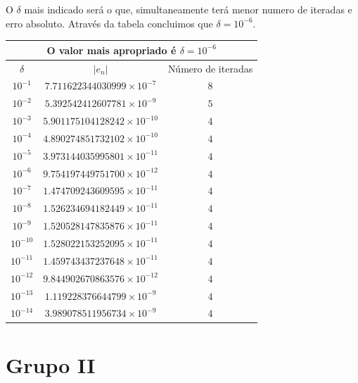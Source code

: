 \documentclass[a4paper,10pt]{extarticle}
\begin{document}
\begin{enumerate}
\begin{enumerate}
{}
O $\delta$ mais indicado será o que, simultaneamente terá menor numero de iteradas e erro absoluto. Através da tabela concluimos que $\delta=10^{-6}$.
\begin{center}
{\small \begin{tabular}{|c|c|c|}
\hline
\multicolumn{3}{|c|}{O valor mais apropriado é $\delta=10^{-6}$}\\
\hline
$\delta$&$|e_n|$&Número de iteradas\\
\hline
$10^{-1}$&$7.711622344030999\times 10^{-7}$&$8$\\
\hline
$10^{-2}$&$5.392542412607781\times 10^{-9}$&$5$\\
\hline
$10^{-3}$&$5.901175104128242\times 10^{-10}$&$4$\\
\hline
$10^{-4}$&$4.890274851732102\times 10^{-10}$&$4$\\
\hline
$10^{-5}$&$3.973144035995801\times 10^{-11}$&$4$\\
\hline
$10^{-6}$&$9.754197449751700\times 10^{-12}$&$4$\\
\hline
$10^{-7}$&$1.474709243609595\times 10^{-11}$&$4$\\
\hline
$10^{-8}$&$1.526234694182449\times 10^{-11}$&$4$\\
\hline
$10^{-9}$&$1.520528147835876\times 10^{-11}$&$4$\\
\hline
$10^{-10}$&$1.528022153252095\times 10^{-11}$&$4$\\
\hline
$10^{-11}$&$1.459743437237648\times 10^{-11}$&$4$\\
\hline
$10^{-12}$&$9.844902670863576\times 10^{-12}$&$4$\\
\hline
$10^{-13}$&$1.119228376644799\times 10^{-9}$&$4$\\
\hline
$10^{-14}$&$3.989078511956734\times 10^{-9}$&$4$\\
\hline
\end{tabular}}
\end{center}

\end{enumerate}
\end{enumerate}

\section*{Grupo II}
\end{document}

